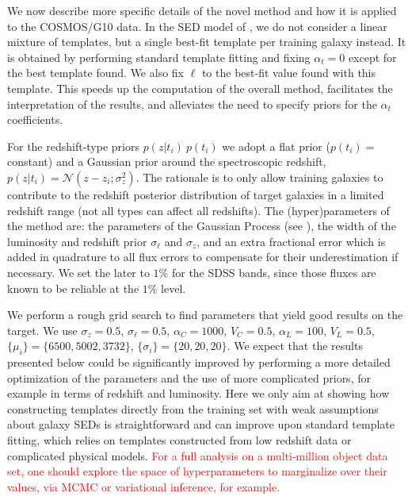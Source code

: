 \documentclass[aps,prd,showpacs,superscriptaddress,groupedaddress]{revtex4}  %
\newcommand{\bl}[1]{\textcolor{red}{#1}}
\begin{document}
We now describe more specific details of the novel method and how it is applied to the COSMOS/G10 data.
In the SED model of , we do not consider a linear mixture of templates, but a single best-fit template per training galaxy instead.
It is obtained by performing standard template fitting and fixing $\alpha_t=0$ except for the best template found. 
We also fix $\ell$ to the best-fit value found with this template.
This speeds up the computation of the overall method, facilitates the interpretation of the results, and alleviates the need to specify priors for the $\alpha_t$ coefficients.

For the redshift-type priors $p(z | t_i) \ p(t_i)$ we adopt a flat prior ($ p(t_i) = $ constant) and a Gaussian prior around the spectroscopic redshift, $p(z | t_i) = \mathcal{N}(z-z_i; \sigma^2_z)$.
The rationale is to only allow training galaxies to contribute to the redshift posterior distribution of target galaxies in a limited redshift range (\ie not all types can affect all redshifts).
The (hyper)parameters of the method are: the parameters of the Gaussian Process (see ), the width of the luminosity and redshift prior $\sigma_\ell$ and $\sigma_z$,  and an extra fractional error which is added in quadrature to all flux errors to compensate for their underestimation if necessary.
We set the later to $1\%$ for the SDSS bands, since those fluxes are known to be reliable at the $1\%$ level.

We perform a rough grid search to find parameters that yield good results on the target.
We use
$\sigma_z = 0.5$, 
$\sigma_\ell = 0.5$,
$\alpha_C= 1000$,
$V_C= 0.5$,
$\alpha_L= 100$,
$V_L= 0.5$,
$\{\mu_i\} = \{ 6500, 5002, 3732 \}$,
$\{\sigma_i\} = \{ 20, 20, 20 \}$.
We expect that the results presented below could be significantly improved by performing a more detailed optimization of the parameters and the use of more complicated priors, for example in terms of redshift and luminosity.
Here we only aim at showing how constructing templates directly from the training set with weak assumptions about galaxy SEDs is straightforward and can improve upon standard template fitting, which relies on templates constructed from low redshift data or complicated physical models.
\bl{For a full analysis on a multi-million object data set, one should explore the space of hyperparameters to marginalize over their values, via MCMC or variational inference, for example.}
\end{document}
